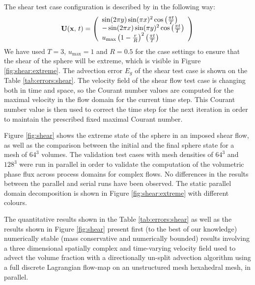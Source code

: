 The shear test case configuration is described by \citet{LiovicCVTNA2006} in the following way:
%
\begin{align}
    \mathbf U(\mathbf x,\,t) = 
    \left(      
			\begin{array}{l}
				\sin(2\pi y) \sin(\pi x)^2 \cos \left(\frac{\pi t}{T}\right)\\
				-\sin(2\pi x) \sin(\pi y)^2 \cos \left(\frac{\pi t}{T}\right)\\
				u_\text{max} \left(1 - \frac{r}{R}\right)^2 \left(\frac{\pi t}{T}\right)
			\end{array}
    \right)
    \label{equation:shear-test-case}
\end{align}
%
We have used $T=3$, $u_\text{max} = 1$ and $R=0.5$ for the case settings to ensure
that the shear of the sphere will be extreme, which is visible in Figure
\ref{fig:shear:extreme}. The advection error $E_g$ of the shear test case is
shown on the Table \ref{tab:errors:shear}. The velocity field of the shear flow
test case is changing both in time and space, so the Courant number values are
computed for the maximal velocity in the flow domain for the current time step.
This Courant number value is then used to correct the time step for the next
iteration in order to maintain the prescribed fixed maximal Courant number. 

Figure \ref{fig:shear} shows the extreme state of the sphere in an imposed
shear flow, as well as the comparison between the initial and the final sphere
state for a mesh of $64^3$ volumes. The validation test cases with mesh
densities of $64^3$ and $128^3$ were run in parallel in order to validate the
computation of the volumetric phase flux across process domains for complex
flows. No differences in the results between the parallel and serial runs have 
been observed. The static parallel domain decomposition is shown in Figure
\ref{fig:shear:extreme} with different colours.

The quantitative results shown in the Table \ref{tab:errors:shear} as well as
the results shown in Figure \ref{fig:shear} present first (to the best of our
knowledge) numerically stable (mass conservative and numerically bounded)
results involving a three dimensional spatially complex and time-varying
velocity field used to advect the volume fraction with a directionally un-split
advection algorithm using a full discrete Lagrangian flow-map on an
unstructured mesh hexahedral mesh, in parallel. 

